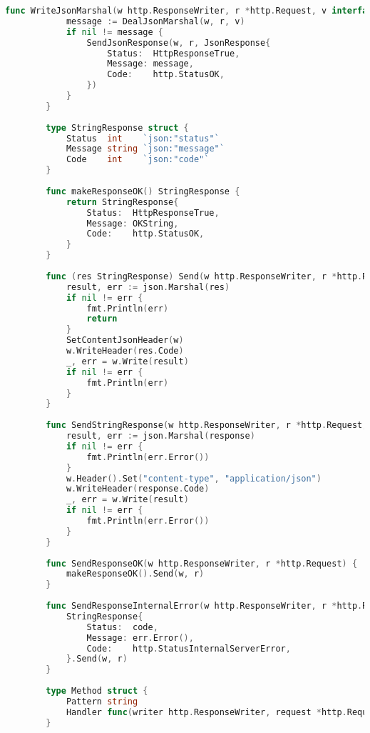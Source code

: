 \documentclass[UTF8]{ctexart}
\begin{document}
\begin{lstlisting}[language=go]
        func WriteJsonMarshal(w http.ResponseWriter, r *http.Request, v interface{}) {
            message := DealJsonMarshal(w, r, v)
            if nil != message {
                SendJsonResponse(w, r, JsonResponse{
                    Status:  HttpResponseTrue,
                    Message: message,
                    Code:    http.StatusOK,
                })
            }
        }
        
        type StringResponse struct {
            Status  int    `json:"status"`
            Message string `json:"message"`
            Code    int    `json:"code"`
        }
        
        func makeResponseOK() StringResponse {
            return StringResponse{
                Status:  HttpResponseTrue,
                Message: OKString,
                Code:    http.StatusOK,
            }
        }
        
        func (res StringResponse) Send(w http.ResponseWriter, r *http.Request) {
            result, err := json.Marshal(res)
            if nil != err {
                fmt.Println(err)
                return
            }
            SetContentJsonHeader(w)
            w.WriteHeader(res.Code)
            _, err = w.Write(result)
            if nil != err {
                fmt.Println(err)
            }
        }
        
        func SendStringResponse(w http.ResponseWriter, r *http.Request, response StringResponse) {
            result, err := json.Marshal(response)
            if nil != err {
                fmt.Println(err.Error())
            }
            w.Header().Set("content-type", "application/json")
            w.WriteHeader(response.Code)
            _, err = w.Write(result)
            if nil != err {
                fmt.Println(err.Error())
            }
        }
        
        func SendResponseOK(w http.ResponseWriter, r *http.Request) {
            makeResponseOK().Send(w, r)
        }
        
        func SendResponseInternalError(w http.ResponseWriter, r *http.Request, err error, code int) {
            StringResponse{
                Status:  code,
                Message: err.Error(),
                Code:    http.StatusInternalServerError,
            }.Send(w, r)
        }
        
        type Method struct {
            Pattern string                                                  `json:"pattern"`
            Handler func(writer http.ResponseWriter, request *http.Request) `json:"handler"`
        }
        

\end{lstlisting}
\end{document}
